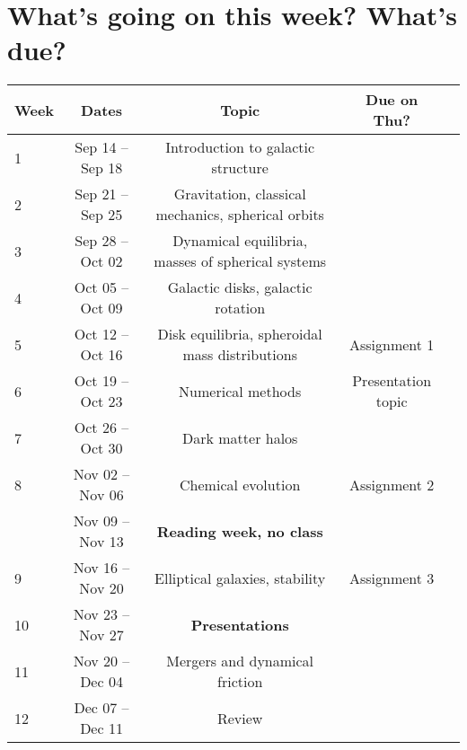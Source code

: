 \documentclass{article}
\begin{document}
\section*{What's going on this week? What's due?}

\begin{table}[H]
\begin{center}
\begin{tabular}{lcccc}
Week & Dates &  \quad Topic & \quad Due on Thu? & \\
\hline
\hline
1 & Sep 14 -- Sep 18 & Introduction to galactic structure & \\
2 & Sep 21 -- Sep 25 & Gravitation, classical mechanics, spherical orbits &  \\ 
3 & Sep 28 -- Oct 02 & Dynamical equilibria, masses of spherical systems &  \\
4 & Oct 05 -- Oct 09 & Galactic disks, galactic rotation &  \\
5 & Oct 12 -- Oct 16 & Disk equilibria, spheroidal mass distributions &  Assignment 1 \\
6 & Oct 19 -- Oct 23 & Numerical methods & Presentation topic  \\ 
7 & Oct 26 -- Oct 30 & Dark matter halos &   \\
8 & Nov 02 -- Nov 06 & Chemical evolution & Assignment 2 \\
 & Nov 09 -- Nov 13  & {\bf Reading week, no class}&  \\ 
9 & Nov 16 -- Nov 20 & Elliptical galaxies, stability & Assignment 3 \\
10 & Nov 23 -- Nov 27 & {\bf Presentations}&  \\ 
11 & Nov 20 -- Dec 04 & Mergers and dynamical friction& \\
12 & Dec 07 -- Dec 11 & Review &   
\end{tabular}
\end{center}
\end{table}
\end{document}
